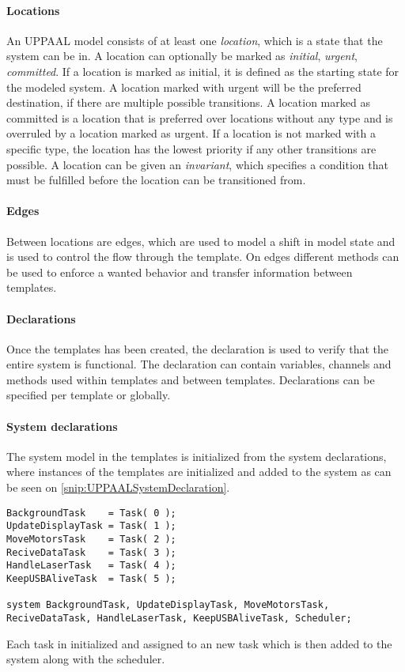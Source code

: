 \paragraph{Locations}
An UPPAAL model consists of at least one \textit{location}, which is a state that the system can be in. 
A location can optionally be marked as \textit{initial}, \textit{urgent}, \textit{committed}. 
If a location is marked as initial, it is defined as the starting state for the modeled system. 
A location marked with urgent will be the preferred destination, if there are multiple possible transitions. 
A location marked as committed is a location that is preferred over locations without any type and is overruled by a location marked as urgent. 
If a location is not marked with a specific type, the location has the lowest priority if any other transitions are possible. 
A location can be given an \textit{invariant}, which specifies a condition that must be fulfilled before the location can be transitioned from.

\paragraph{Edges}
Between locations are edges, which are used to model a shift in model state and is used to control the flow through the template. 
On edges different methods can be used to enforce a wanted behavior and transfer information between templates. 

\paragraph{Declarations}
Once the templates has been created, the declaration is used to verify that the entire system is functional. 
The declaration can contain variables, channels and methods used within templates and between templates. 
Declarations can be specified per template or globally. 

\paragraph{System declarations}
The system model in the templates is initialized from the system declarations, where instances of the templates are initialized and added to the system as can be seen on \autoref{snip:UPPAALSystemDeclaration}. 


\begin{lstlisting}[label={snip:UPPAALSystemDeclaration},caption={System declaration from UPPAAL},frame=tlrb,numbers=none]
BackgroundTask    = Task( 0 );
UpdateDisplayTask = Task( 1 );
MoveMotorsTask    = Task( 2 );
ReciveDataTask    = Task( 3 );
HandleLaserTask   = Task( 4 );
KeepUSBAliveTask  = Task( 5 );

system BackgroundTask, UpdateDisplayTask, MoveMotorsTask, ReciveDataTask, HandleLaserTask, KeepUSBAliveTask, Scheduler;
\end{lstlisting}
Each task in initialized and assigned to an new task which is then added to the system along with the scheduler. 

